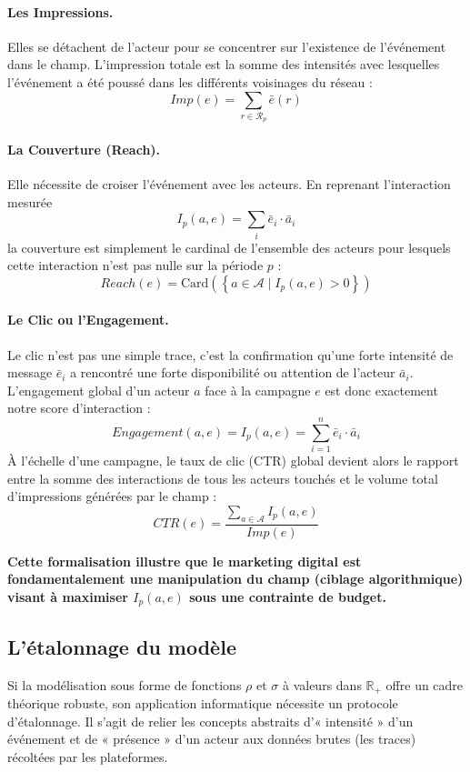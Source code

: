 \documentclass[11pt]{article}
\begin{document}
			\paragraph{Les Impressions.} Elles se détachent de l'acteur pour se concentrer sur l'existence de l'événement dans le champ. L'impression totale est la somme des intensités avec lesquelles l'événement a été poussé dans les différents voisinages du réseau :
			$$Imp(e) = \sum_{r \in \mathcal{R}_p} \bar{e}(r)$$
			
			\paragraph{La Couverture (Reach).} Elle nécessite de croiser l'événement avec les acteurs. En reprenant l'interaction mesurée $$I_p(a,e) = \sum_{i} \bar{e}_i \cdot \bar{a}_i$$ la couverture est simplement le cardinal de l'ensemble des acteurs pour lesquels cette interaction n'est pas nulle sur la période $p$ :
			$$Reach(e) = \text{Card} \left( \left\{ a \in \mathcal{A} \mid I_p(a,e) > 0 \right\} \right)$$
			
			\paragraph{Le Clic ou l'Engagement.} Le clic n'est pas une simple trace, c'est la confirmation qu'une forte intensité de message $\bar{e}_i$ a rencontré une forte disponibilité ou attention de l'acteur $\bar{a}_i$. L'engagement global d'un acteur $a$ face à la campagne $e$ est donc exactement notre score d'interaction :
			$$Engagement(a,e) = I_p(a,e) = \sum_{i=1}^n \bar{e}_i \cdot \bar{a}_i$$
			À l'échelle d'une campagne, le taux de clic (CTR) global devient alors le rapport entre la somme des interactions de tous les acteurs touchés et le volume total d'impressions générées par le champ :
			$$CTR(e) = \frac{\sum_{a \in \mathcal{A}} I_p(a,e)}{Imp(e)}$$
			
			\textbf{Cette formalisation illustre que le marketing digital est fondamentalement une manipulation du champ (ciblage algorithmique) visant à maximiser $I_p(a,e)$ sous une contrainte de budget.}
			
	
		\subsection{L'étalonnage du modèle}
	
			Si la modélisation sous forme de fonctions $\rho$ et $\sigma$ à valeurs dans $\mathbb{R}_+$ offre un cadre théorique robuste, son application informatique nécessite un protocole d'étalonnage. Il s'agit de relier les concepts abstraits d'« intensité » d'un événement et de « présence » d'un acteur aux données brutes (les traces) récoltées par les plateformes.
			
\end{document}
